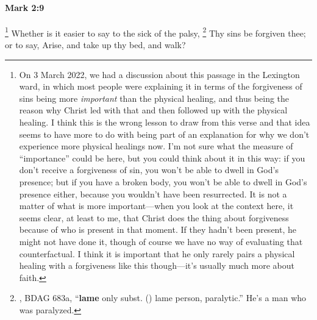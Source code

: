 		\paragraph{Mark 2:9} %
			\label{MARK-2-9}

				\footnote{%
					On 3 March 2022, we had a discussion about this passage in the Lexington ward, in which most people were explaining it in terms of the forgiveness of sins being more \textit{important} than the physical healing, and thus being the reason why Christ led with that and then followed up with the physical healing. I think this is the wrong lesson to draw from this verse and that idea seems to have more to do with being part of an explanation for why we don't experience more physical healings now. I'm not sure what the measure of ``importance'' could be here, but you could think about it in this way: if you don't receive a forgiveness of sin, you won't be able to dwell in God's presence; but if you have a broken body, you won't be able to dwell in God's presence either, because you wouldn't have been resurrected. It is not a matter of what is more important---when you look at the context here, it seems clear, at least to me, that Christ does the thing about forgiveness because of who is present in that moment. If they hadn't been present, he might not have done it, though of course we have no way of evaluating that counterfactual. I think it is important that he only rarely pairs a physical healing with a forgiveness like this though---it's usually much more about faith.
					}%
			Whether is it easier to say to the sick of the palsy,%
			\footnote{%
				, BDAG 683a, ``\textbf{lame} only subst. ()  lame person, paralytic.'' He's a man who was paralyzed.
				} 
			Thy sins be forgiven thee; or to say, Arise, and take up thy bed, and walk?

			\begin{framed}
			\scriptsize
				\begin{compactdesc}
					\item[SBLG] 
				\end{compactdesc}
			\end{framed}

